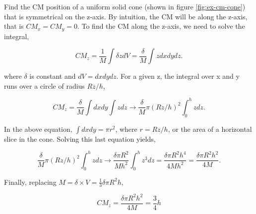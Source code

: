 Find the CM position of a uniform solid cone (shown in figure \ref{fig:ex-cm-cone}) that is symmetrical on the z-axis. By intuition, the CM will be along the z-axis, that is $CM_x = CM_y = 0$. To find the CM along the z-axis, we need to solve the integral,

\begin{equation*}
    CM_z = \frac{1}{M} \int \delta z dV = \frac{\delta}{M} \int z dx dy dz.
\end{equation*}

\noindent where $\delta$ is constant and $dV = dx dy dz$. For a given z, the integral over x and y runs over a circle of radius $Rz/h$,

\begin{equation*}
    CM_z = \frac{\delta}{M} \int dxdy \int z dz \rightarrow \frac{\delta}{M} \pi (Rz/h)^2 \int^h_0 zdz.
\end{equation*}

In the above equation, $\int dx dy = \pi r^2$, where $r = Rz/h$, or the area of a horizontal slice in the cone. Solving this last equation yields,

\begin{equation*}
    \frac{\delta}{M} \pi (Rz/h)^2 \int^h_0 zdz \rightarrow \frac{\delta \pi R^2}{M h^2} \int^h_0 z^3 dz = \frac{\delta \pi R^2 h^4}{4 M h^2} = \frac{\delta \pi R^2 h^2}{4 M}.
\end{equation*}

Finally, replacing $M = \delta \times V = \frac{1}{3} \delta \pi R^2 h$,

\begin{equation*}
    CM_z = \frac{\delta \pi R^2 h^2}{4 M} = \frac{3}{4}h
\end{equation*}

{\exend}
